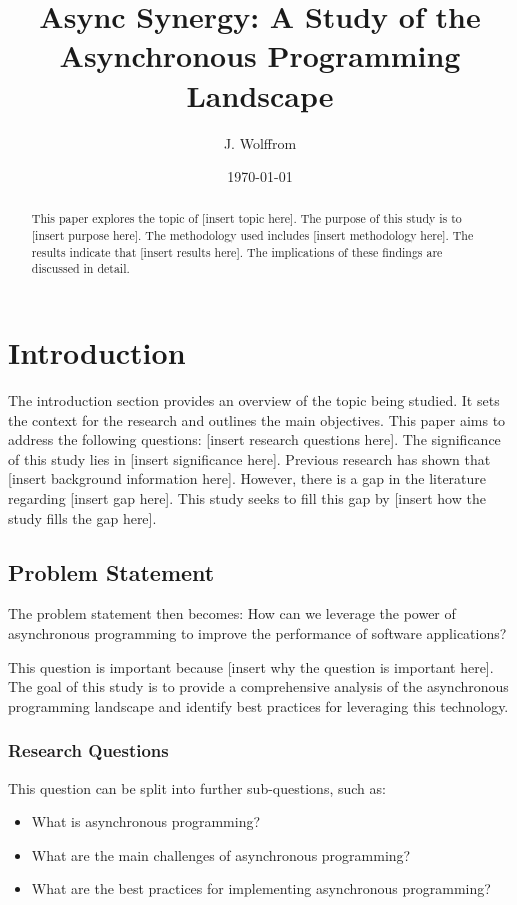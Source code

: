 \documentclass{article}
\title{Async Synergy: A Study of the Asynchronous Programming Landscape}
\author{J. Wolffrom}
\date{\today}
\begin{document}
\maketitle

\begin{abstract}
This paper explores the topic of [insert topic here]. The purpose of this study is to [insert purpose here]. The methodology used includes [insert methodology here]. The results indicate that [insert results here]. The implications of these findings are discussed in detail.
\end{abstract}

\tableofcontents

\newpage
\section{Introduction}

The introduction section provides an overview of the topic being studied. It sets the context for the research and outlines the main objectives. This paper aims to address the following questions: [insert research questions here]. The significance of this study lies in [insert significance here]. Previous research has shown that [insert background information here]. However, there is a gap in the literature regarding [insert gap here]. This study seeks to fill this gap by [insert how the study fills the gap here].

\subsection{Problem Statement}

The problem statement then becomes: How can we leverage the power of asynchronous programming to improve the performance of software applications? 

This question is important because [insert why the question is important here]. The goal of this study is to provide a comprehensive analysis of the asynchronous programming landscape and identify best practices for leveraging this technology.

\subsubsection{Research Questions}

This question can be split into further sub-questions, such as:

\begin{itemize}
    \item What is asynchronous programming?
    \item What are the main challenges of asynchronous programming?
    \item What are the best practices for implementing asynchronous programming?
\end{itemize}
\end{document}
